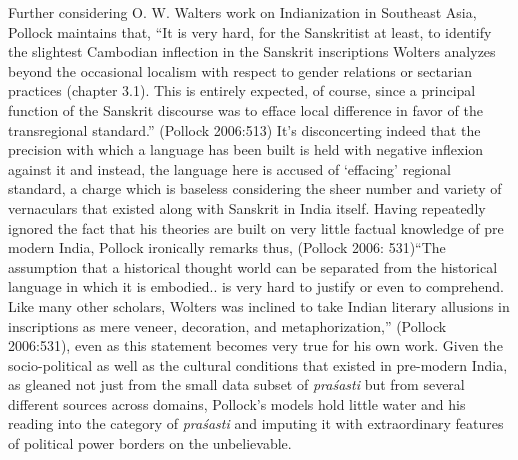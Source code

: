 Further considering O. W. Walters work on Indianization in Southeast Asia, Pollock maintains that, “It is very hard, for the Sanskritist at least, to identify the slightest Cambodian inflection in the Sanskrit inscriptions Wolters analyzes beyond the occasional localism with respect to gender relations or sectarian practices (chapter 3.1). This is entirely expected, of course, since a principal function of the Sanskrit discourse was to efface local difference in favor of the transregional standard.” (Pollock 2006:513) It’s disconcerting indeed that the precision with which a language has been built is held with negative inflexion against it and instead, the language here is accused of ‘effacing’ regional standard, a charge which is baseless considering the sheer number and variety of vernaculars that existed along with Sanskrit in India itself. Having repeatedly ignored the fact that his theories are built on very little factual knowledge of pre modern India, Pollock ironically remarks thus, (Pollock 2006: 531)“The assumption that a historical thought world can be separated from the historical language in which it is embodied.. is very hard to justify or even to comprehend. Like many other scholars, Wolters was inclined to take Indian literary allusions in inscriptions as mere veneer, decoration, and metaphorization,” (Pollock 2006:531), even as this statement becomes very true for his own work. Given the socio-political as well as the cultural conditions that existed in pre-modern India, as gleaned not just from the small data subset of \textit{praśasti} but from several different sources across domains, Pollock’s models hold little water and his reading into the category of \textit{praśasti} and imputing it with extraordinary features of political power borders on the unbelievable.


